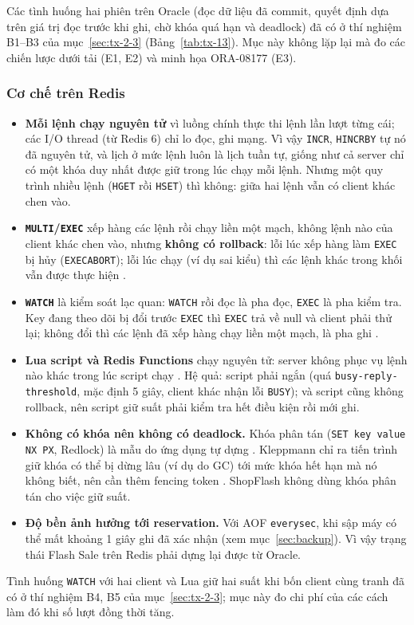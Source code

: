 Các tình huống hai phiên trên Oracle (đọc dữ liệu đã commit, quyết định dựa trên giá trị đọc trước khi ghi, chờ khóa quá hạn và deadlock) đã có ở thí nghiệm B1--B3 của mục~\ref{sec:tx-2-3} (Bảng~\ref{tab:tx-13}). Mục này không lặp lại mà đo các chiến lược dưới tải (E1, E2) và minh họa ORA-08177 (E3).

\subsubsection{Cơ chế trên Redis}\label{sec:cc-redis}

\begin{itemize}
  \item \textbf{Mỗi lệnh chạy nguyên tử} vì luồng chính thực thi lệnh lần lượt từng cái; các I/O thread (từ Redis 6) chỉ lo đọc, ghi mạng. Vì vậy \texttt{INCR}, \texttt{HINCRBY} tự nó đã nguyên tử, và lịch ở mức lệnh luôn là lịch tuần tự, giống như cả server chỉ có một khóa duy nhất được giữ trong lúc chạy mỗi lệnh. Nhưng một quy trình nhiều lệnh (\texttt{HGET} rồi \texttt{HSET}) thì không: giữa hai lệnh vẫn có client khác chen vào.
  \item \textbf{\texttt{MULTI}/\texttt{EXEC}} xếp hàng các lệnh rồi chạy liền một mạch, không lệnh nào của client khác chen vào, nhưng \textbf{không có rollback}: lỗi lúc xếp hàng làm \texttt{EXEC} bị hủy (\texttt{EXECABORT}); lỗi lúc chạy (ví dụ sai kiểu) thì các lệnh khác trong khối vẫn được thực hiện \cite{cc-redis-transactions}.
  \item \textbf{\texttt{WATCH}} là kiểm soát lạc quan: \texttt{WATCH} rồi đọc là pha đọc, \texttt{EXEC} là pha kiểm tra. Key đang theo dõi bị đổi trước \texttt{EXEC} thì \texttt{EXEC} trả về null và client phải thử lại; không đổi thì các lệnh đã xếp hàng chạy liền một mạch, là pha ghi \cite{cc-redis-transactions}.
  \item \textbf{Lua script và Redis Functions} chạy nguyên tử: server không phục vụ lệnh nào khác trong lúc script chạy \cite{cc-redis-eval, cc-redis-functions}. Hệ quả: script phải ngắn (quá \texttt{busy-reply-threshold}, mặc định 5 giây, client khác nhận lỗi \texttt{BUSY}); và script cũng không rollback, nên script giữ suất phải kiểm tra hết điều kiện rồi mới ghi.
  \item \textbf{Không có khóa nên không có deadlock.} Khóa phân tán (\texttt{SET key value NX PX}, Redlock) là mẫu do ứng dụng tự dựng \cite{cc-redis-distlock}. Kleppmann chỉ ra tiến trình giữ khóa có thể bị dừng lâu (ví dụ do GC) tới mức khóa hết hạn mà nó không biết, nên cần thêm fencing token \cite{cc-kleppmann2016, cc-kleppmann2017}. ShopFlash không dùng khóa phân tán cho việc giữ suất.
  \item \textbf{Độ bền ảnh hưởng tới reservation.} Với AOF \texttt{everysec}, khi sập máy có thể mất khoảng 1 giây ghi đã xác nhận (xem mục~\ref{sec:backup}). Vì vậy trạng thái Flash Sale trên Redis phải dựng lại được từ Oracle.
\end{itemize}

Tình huống \texttt{WATCH} với hai client và Lua giữ hai suất khi bốn client cùng tranh đã có ở thí nghiệm B4, B5 của mục~\ref{sec:tx-2-3}; mục này đo chi phí của các cách làm đó khi số lượt đồng thời tăng.
